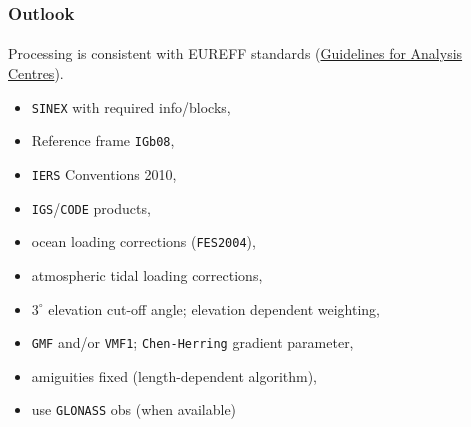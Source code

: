 \documentclass{beamer}
\begin{document}
\begin{frame}\frametitle{Outlook}\framesubtitle{}
  Processing is consistent with EUREFF standards (\href{http://www.epncb.oma.be/_documentation/guidelines/guidelines_analysis_centres.pdf}{Guidelines for Analysis Centres}).
  \begin{itemize}%
    \item \texttt{SINEX} with required info/blocks,
    \item Reference frame \texttt{IGb08},
    \item \texttt{IERS} Conventions 2010,
    \item \texttt{IGS}/\texttt{CODE} products,
    \item ocean loading corrections (\texttt{FES2004}),
    \item atmospheric tidal loading corrections,
    \item $3^{\circ}$ elevation cut-off angle; elevation dependent weighting,
    \item \texttt{GMF} and/or \texttt{VMF1}; \texttt{Chen-Herring} gradient parameter,
    \item amiguities fixed (length-dependent algorithm),
    \item use \texttt{GLONASS} obs (when available)
  \end{itemize}

\end{frame}
\end{document}
